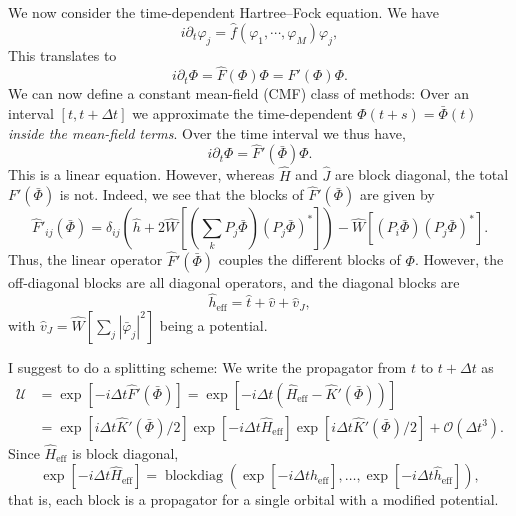 \documentclass[12pt]{article}
\newcommand{\blockdiag}{\operatorname{blockdiag}}
\begin{document}
We now consider the time-dependent Hartree--Fock equation. We have
\begin{equation}
    i \partial_t \varphi_j = \hat{f}(\varphi_1,\cdots,\varphi_M) \varphi_j,
\end{equation}
This translates to
\begin{equation}
    i \partial_t \Phi = \hat{F}(\Phi) \Phi = \hat{F}'(\Phi)\Phi.
\end{equation}
We can now define a constant mean-field (CMF) class of methods: Over an interval $[t, t+\Delta t]$ we approximate the time-dependent $\Phi(t+s) = \bar{\Phi}(t)$ \emph{inside the mean-field terms}. Over the time interval we thus have,
\begin{equation}
    i \partial_t \Phi = \hat{F}'(\bar{\Phi}) \Phi.
\end{equation}
This is a linear equation. However, whereas $\hat{H}$ and $\hat{J}$ are block diagonal, the total $F'(\bar{\Phi})$ is not. Indeed, we see that the blocks of $\hat{F}'(\bar{\Phi})$ are given by 
\begin{equation}
    \hat{F}'_{ij}(\bar{\Phi}) = \delta_{ij} \left(\hat{h} + 2 \hat{W}[(\sum_k P_j \bar{\Phi}) (P_j\bar{\Phi})^*] \right) -  \hat{W}[(P_i \bar{\Phi} ) (P_j\bar{\Phi})^*] .
\end{equation}
Thus, the linear operator $\hat{F}'(\bar{\Phi})$ couples the different blocks of $\Phi$. However, the off-diagonal blocks are all diagonal operators, and the diagonal blocks are 
\begin{equation}
    \hat{h}_{\text{eff}} = \hat{t} + \hat{v} + \hat{v}_J,
\end{equation}
with $\hat{v}_J = \hat{W}[\sum_j |\bar{\varphi}_j|^2]$ being a potential.

I suggest to do a splitting scheme: We write the propagator from $t$ to $t + \Delta t$ as
\begin{equation}
    \begin{split}
    \mathcal{U} &= \exp[-i\Delta t \hat{F}'(\bar{\Phi})] = \exp[ -i \Delta t (\hat{H}_\text{eff} - \hat{K}'(\bar{\Phi}))] \\ &= \exp[i\Delta t \hat{K}'(\bar{\Phi})/2] \exp[-i\Delta t \hat{H}_\text{eff}] \exp[i\Delta t \hat{K}'(\bar{\Phi})/2] + \mathcal{O}(\Delta t^3).
    \end{split}
\end{equation}
Since $\hat{H}_\text{eff}$ is block diagonal,
\begin{equation}
    \exp[-i\Delta t \hat{H}_\text{eff}] = \blockdiag(\exp[-i\Delta t \hat{h}_\text{eff}],\ldots,\exp[-i\Delta t \hat{h}_\text{eff}]),
\end{equation}
that is, each block is a propagator for a single orbital with a modified potential.
\end{document}
